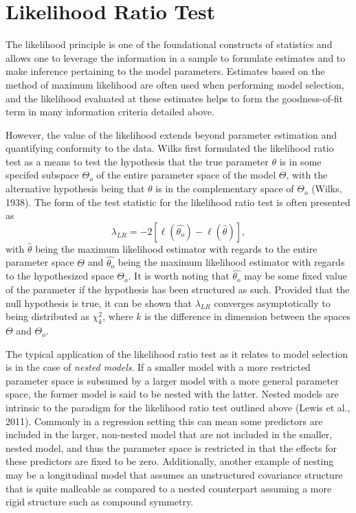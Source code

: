 		\section{Likelihood Ratio Test}

		The likelihood principle is one of the foundational constructs of statistics and allows one to leverage the information in a sample to formulate estimates and to make inference pertaining
		to the model parameters. Estimates based on the method of maximum likelihood are often used when performing model selection, and the likelihood evaluated at
		these estimates helps to form the goodness-of-fit term in many information criteria detailed above.

		However, the value of the likelihood extends beyond parameter estimation and quantifying conformity to the data. Wilks first formulated the likelihood ratio test as a means to test the
		hypothesis that the true parameter $\theta$ is in some specifed subspace $\Theta_o$ of the entire parameter space of the model $\Theta$, with the alternative hypothesis being that
		$\theta$ is in the complementary space of $\Theta_o$ (Wilks, 1938). The form of the test statistic for the likelihood ratio test is often presented as
		\begin{equation}
			\lambda_{LR} = -2 \left[ \ell (\hat{\theta_o}) - \ell (\hat{\theta}) \right] ,
		\end{equation}
		with $\hat{\theta}$ being the maximum likelihood estimator with regards to the entire parameter space $\Theta$ and $\hat{\theta_o}$ being the maximum likelihood estimator with regards to the
		hypothesized space $\Theta_o$. It is worth noting that $\hat{\theta_o}$ may be some fixed value of the parameter if the hypothesis has been structured as such. Provided that the null hypothesis
		is true, it can be shown that $\lambda_{LR}$ converges asymptotically to being distributed as $\chi^2_{k}$, where $k$ is the difference in dimension between the spaces $\Theta$ and
		$\Theta_o$.

		The typical application of the likelihood ratio test as it relates to model selection is in the case of \textit{nested models}. If a smaller model with a more restricted parameter space is subsumed
		by a larger model with a more general parameter space, the former model is said to be nested with the latter. Nested models are intrinsic to the paradigm for the likelihood ratio test outlined above (Lewis et al., 2011).
		Commonly in a regression setting this can mean some predictors are included in the larger, non-nested model that are not included in the smaller, nested model, and thus the parameter space is
		restricted in that the effects for these predictors are fixed to be zero. Additionally, another example of nesting may be a longitudinal model that assumes an unstructured covariance structure
		that is quite malleable as compared to a nested counterpart assuming a more rigid structure such as compound symmetry.

